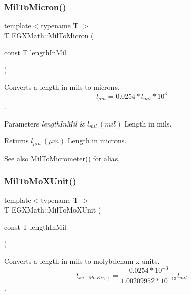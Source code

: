 \subsubsection{\texorpdfstring{Mil\+To\+Micron()}{MilToMicron()}}
{\footnotesize\ttfamily template$<$typename T $>$ \\
T E\+G\+X\+Math\+::\+Mil\+To\+Micron (\begin{DoxyParamCaption}\item[{const T}]{length\+In\+Mil }\end{DoxyParamCaption})}



Converts a length in mils to microns. \[ l_{\mu m}=0.0254 * l_{mil} * 10^{3} \]. 


\begin{DoxyParams}{Parameters}
{\em length\+In\+Mil} & $ l_{mil}\ (mil)$ Length in mils. \\
\hline
\end{DoxyParams}
\begin{DoxyReturn}{Returns}
$ l_{\mu m}\ (\mu m)$ Length in microns. 
\end{DoxyReturn}
\begin{DoxySeeAlso}{See also}
\mbox{\hyperlink{group___e_g_x_math-_conversions-_length_conversions-_imperial-_mil-_s_i_ga696a1e5a2043b738df68bf2b9e9be4fc}{Mil\+To\+Micrometer()}} for alias. 
\end{DoxySeeAlso}
\mbox{\label{group___e_g_x_math-_conversions-_length_conversions-_imperial-_mil-_non-_s_i_ga673efde012cc982641b2eb1266f88f3a}} 
\subsubsection{\texorpdfstring{Mil\+To\+Mo\+X\+Unit()}{MilToMoXUnit()}}
{\footnotesize\ttfamily template$<$typename T $>$ \\
T E\+G\+X\+Math\+::\+Mil\+To\+Mo\+X\+Unit (\begin{DoxyParamCaption}\item[{const T}]{length\+In\+Mil }\end{DoxyParamCaption})}



Converts a length in mils to molybdenum x units. \[ l_{xu(Mo\ K\alpha_1)}=\frac{0.0254 * 10^{-3}}{1.00209952*10^{-13}} l_{mil}\]. 


